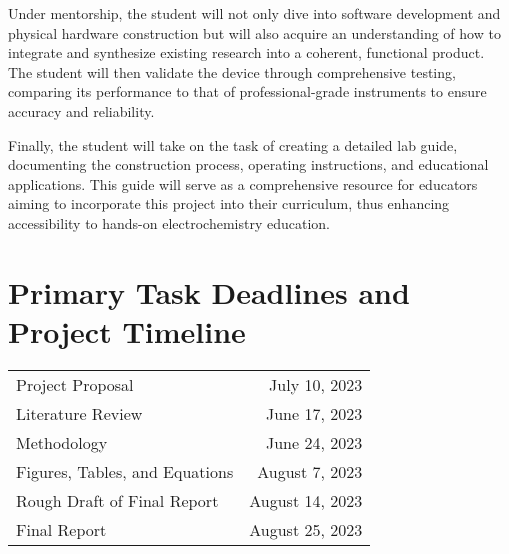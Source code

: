 \documentclass{article}
\begin{document}
Under mentorship, the student will not only dive into software development and physical hardware construction but will also acquire an understanding of how to integrate and synthesize existing research into a coherent, functional product. The student will then validate the device through comprehensive testing, comparing its performance to that of professional-grade instruments to ensure accuracy and reliability.

Finally, the student will take on the task of creating a detailed lab guide, documenting the construction process, operating instructions, and educational applications. This guide will serve as a comprehensive resource for educators aiming to incorporate this project into their curriculum, thus enhancing accessibility to hands-on electrochemistry education.

\section*{\textcolor{mycolor}{Primary Task Deadlines and Project Timeline}}
\begin{table}[H]
  \centering
  \begin{tabular}{l|r}
  Project Proposal & July 10, 2023 \\
  Literature Review & June 17, 2023 \\
  Methodology & June 24, 2023 \\
  Figures, Tables, and Equations & August 7, 2023 \\
  Rough Draft of Final Report & August 14, 2023 \\
  Final Report & August 25, 2023\\
  \end{tabular}
  \end{table}
\end{document}
